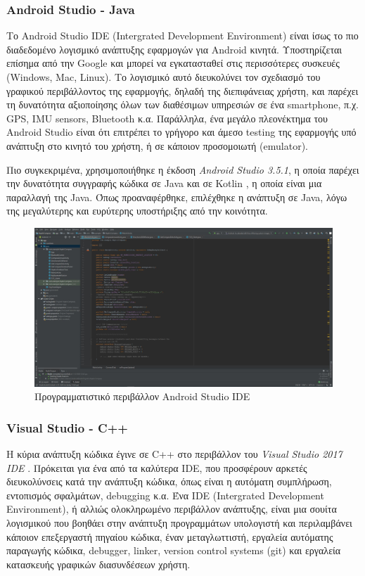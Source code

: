 \subsubsection{Android Studio - Java}
Το Android Studio IDE (Intergrated Development Environment) \cite{android_studio:online} είναι ίσως το πιο διαδεδομένο λογισμικό ανάπτυξης εφαρμογών για Android κινητά. Υποστηρίζεται επίσημα από την Google και μπορεί να εγκατασταθεί στις περισσότερες συσκευές (Windows, Mac, Linux). Το λογισμικό αυτό διευκολύνει τον σχεδιασμό του γραφικού περιβάλλοντος της εφαρμογής, δηλαδή της διεπιφάνειας χρήστη, και παρέχει τη δυνατότητα αξιοποίησης όλων των διαθέσιμων υπηρεσιών σε ένα smartphone, π.χ. GPS, IMU sensors, Bluetooth κ.α. Παράλληλα, ένα μεγάλο πλεονέκτημα του Android Studio είναι ότι επιτρέπει το γρήγορο και άμεσο testing της εφαρμογής υπό ανάπτυξη στο κινητό του χρήστη, ή σε κάποιον προσομοιωτή (emulator).

Πιο συγκεκριμένα, χρησιμοποιήθηκε η έκδοση \emph{Android Studio 3.5.1}, η οποία παρέχει την δυνατότητα συγγραφής κώδικα σε Java \cite{wiki:java} και σε Kotlin \cite{wiki:kotlin}, η οποία είναι μια παραλλαγή της Java. Όπως προαναφέρθηκε, επιλέχθηκε η ανάπτυξη σε Java, λόγω της μεγαλύτερης και ευρύτερης υποστήριξης από την κοινότητα.

\begin{figure}[H]
    \centering
    \includegraphics[width=\textwidth]{images/android_studio.JPG}
    \caption{Προγραμματιστικό περιβάλλον Android Studio IDE}
    \label{fig:android-studio}
\end{figure}

\subsubsection{Visual Studio - C++}
Η κύρια ανάπτυξη κώδικα έγινε σε C++ στο περιβάλλον του\emph{ Visual Studio 2017 IDE} \cite{VisualSt72:online}. Πρόκειται για ένα από τα καλύτερα IDE, που προσφέρουν αρκετές διευκολύνσεις κατά την ανάπτυξη κώδικα, όπως είναι η αυτόματη συμπλήρωση, εντοπισμός σφαλμάτων, debugging κ.α. Ένα IDE (Intergrated Development Environment), ή αλλιώς ολοκληρωμένο περιβάλλον ανάπτυξης, είναι μια σουίτα λογισμικού που βοηθάει στην ανάπτυξη προγραμμάτων υπολογιστή και περιλαμβάνει κάποιον επεξεργαστή πηγαίου κώδικα, έναν μεταγλωττιστή, εργαλεία αυτόματης παραγωγής κώδικα, debugger, linker, version control systems (git) και εργαλεία κατασκευής γραφικών διασυνδέσεων χρήστη.

